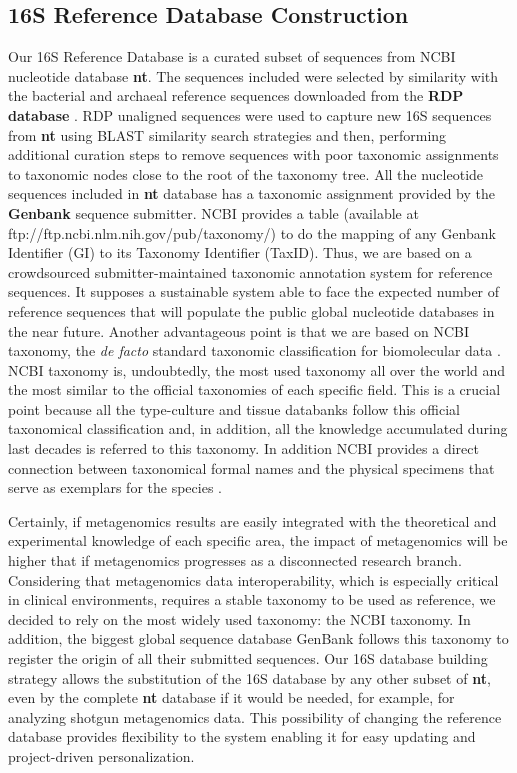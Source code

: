 \documentclass{frontiersSCNS} %
\begin{document}
\subsection{16S Reference Database
Construction}\label{s-reference-database-construction}

Our 16S Reference Database is a curated subset of sequences from NCBI
nucleotide database \textbf{nt}. The sequences included were selected by
similarity with the bacterial and archaeal reference sequences
downloaded from the \textbf{RDP database} \citep{cole2013ribosomal}. RDP
unaligned sequences were used to capture new 16S sequences from
\textbf{nt} using BLAST similarity search strategies and then,
performing additional curation steps to remove sequences with poor
taxonomic assignments to taxonomic nodes close to the root of the
taxonomy tree. All the nucleotide sequences included in \textbf{nt}
database has a taxonomic assignment provided by the \textbf{Genbank}
sequence submitter. NCBI provides a table (available at
ftp://ftp.ncbi.nlm.nih.gov/pub/taxonomy/) to do the mapping of any
Genbank Identifier (GI) to its Taxonomy Identifier (TaxID). Thus, we are
based on a crowdsourced submitter-maintained taxonomic annotation system
for reference sequences. It supposes a sustainable system able to face
the expected number of reference sequences that will populate the public
global nucleotide databases in the near future. Another advantageous
point is that we are based on NCBI taxonomy, the \emph{de facto}
standard taxonomic classification for biomolecular data
\citep{cochrane20102010}. NCBI taxonomy is, undoubtedly, the most used
taxonomy all over the world and the most similar to the official
taxonomies of each specific field. This is a crucial point because all
the type-culture and tissue databanks follow this official taxonomical
classification and, in addition, all the knowledge accumulated during
last decades is referred to this taxonomy. In addition NCBI provides a
direct connection between taxonomical formal names and the physical
specimens that serve as exemplars for the species
\citep{federhen2014type}.

Certainly, if metagenomics results are easily integrated with the
theoretical and experimental knowledge of each specific area, the impact
of metagenomics will be higher that if metagenomics progresses as a
disconnected research branch. Considering that metagenomics data
interoperability, which is especially critical in clinical environments,
requires a stable taxonomy to be used as reference, we decided to rely
on the most widely used taxonomy: the NCBI taxonomy. In addition, the
biggest global sequence database GenBank follows this taxonomy to
register the origin of all their submitted sequences. Our 16S database
building strategy allows the substitution of the 16S database by any
other subset of \textbf{nt}, even by the complete \textbf{nt} database
if it would be needed, for example, for analyzing shotgun metagenomics
data. This possibility of changing the reference database provides
flexibility to the system enabling it for easy updating and
project-driven personalization.
\end{document}
